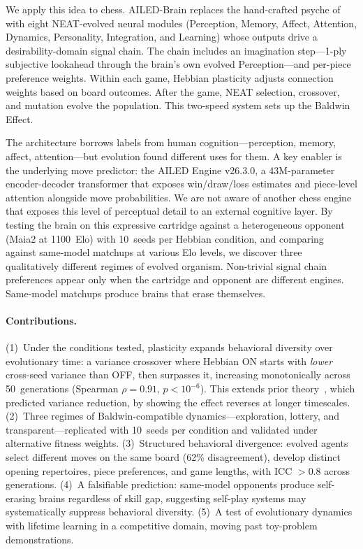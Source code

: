 \documentclass[11pt,a4paper]{article}
\begin{document}
We apply this idea to chess.
AILED-Brain replaces the hand-crafted psyche of~\citet{resendez2026ailed} with eight NEAT-evolved neural modules (Perception, Memory, Affect, Attention, Dynamics, Personality, Integration, and Learning) whose outputs drive a desirability-domain signal chain.
The chain includes an imagination step---1-ply subjective lookahead through the brain's own evolved Perception---and per-piece preference weights.
Within each game, Hebbian plasticity adjusts connection weights based on board outcomes.
After the game, NEAT selection, crossover, and mutation evolve the population.
This two-speed system sets up the Baldwin Effect.

The architecture borrows labels from human cognition---perception, memory, affect, attention---but evolution found different uses for them.
A key enabler is the underlying move predictor: the AILED Engine v26.3.0, a 43M-parameter encoder-decoder transformer that exposes win/draw/loss estimates and piece-level attention alongside move probabilities.
We are not aware of another chess engine that exposes this level of perceptual detail to an external cognitive layer.
By testing the brain on this expressive cartridge against a heterogeneous opponent (Maia2 at 1100~Elo) with 10~seeds per Hebbian condition, and comparing against same-model matchups at various Elo levels, we discover three qualitatively different regimes of evolved organism.
Non-trivial signal chain preferences appear only when the cartridge and opponent are different engines.
Same-model matchups produce brains that erase themselves.

\paragraph{Contributions.}
(1)~Under the conditions tested, plasticity expands behavioral diversity over evolutionary time: a variance crossover where Hebbian ON starts with \emph{lower} cross-seed variance than OFF, then surpasses it, increasing monotonically across 50~generations (Spearman $\rho = 0.91$, $p < 10^{-6}$).
This extends prior theory~\citep{paenke2009baldwin}, which predicted variance reduction, by showing the effect reverses at longer timescales.
(2)~Three regimes of Baldwin-compatible dynamics---exploration, lottery, and transparent---replicated with 10~seeds per condition and validated under alternative fitness weights.
(3)~Structured behavioral divergence: evolved agents select different moves on the same board (62\% disagreement), develop distinct opening repertoires, piece preferences, and game lengths, with ICC $> 0.8$ across generations.
(4)~A falsifiable prediction: same-model opponents produce self-erasing brains regardless of skill gap, suggesting self-play systems may systematically suppress behavioral diversity.
(5)~A test of evolutionary dynamics with lifetime learning in a competitive domain, moving past toy-problem demonstrations.
\end{document}
